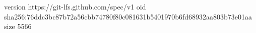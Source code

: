 version https://git-lfs.github.com/spec/v1
oid sha256:76ddc3bc87b72a56cbb74780f80c081631b5401970b6fd68932aa803b73e01aa
size 5566
